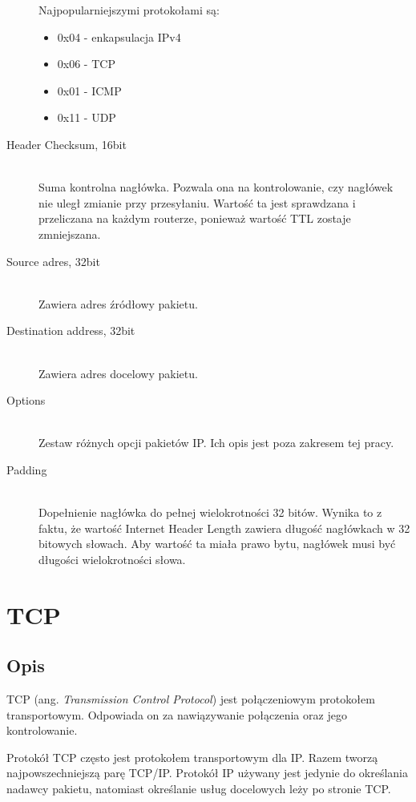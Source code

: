 \documentclass[a4paper,12pt,oneside]{book}
\begin{document}
\begin{description}
				Najpopularniejszymi protokołami są:
				\begin{itemize}
					\item 0x04 - enkapsulacja IPv4
					\item 0x06 - TCP
					\item 0x01 - ICMP
					\item 0x11 - UDP
				\end{itemize}
			\item[Header Checksum, 16bit]\hfill \\
				Suma kontrolna nagłówka.
				Pozwala ona na kontrolowanie, czy nagłówek nie uległ zmianie przy przesyłaniu.
				Wartość ta jest sprawdzana i przeliczana na każdym routerze, ponieważ wartość TTL zostaje zmniejszana.
			\item[Source adres, 32bit]\hfill \\
				Zawiera adres źródłowy pakietu.
			\item[Destination address, 32bit]\hfill \\
				Zawiera adres docelowy pakietu.
			\item[Options]\hfill \\
				Zestaw różnych opcji pakietów IP.
				Ich opis jest poza zakresem tej pracy.
			\item[Padding]\hfill \\
				Dopełnienie nagłówka do pełnej wielokrotności 32 bitów.
				Wynika to z faktu, że wartość Internet Header Length zawiera długość nagłówkach w 32 bitowych słowach.
				Aby wartość ta miała prawo bytu, nagłówek musi być długości wielokrotności słowa.
			\end{description}	
	\section{TCP}
		\subsection{Opis}
			TCP (ang. \textit{Transmission Control Protocol}) jest połączeniowym protokołem transportowym.
			Odpowiada on za nawiązywanie połączenia oraz jego kontrolowanie.

			Protokół TCP często jest protokołem transportowym dla IP.
			Razem tworzą najpowszechniejszą parę TCP/IP.
			Protokół IP używany jest jedynie do określania nadawcy pakietu, natomiast określanie usług docelowych leży po stronie TCP.\\
\end{document}
